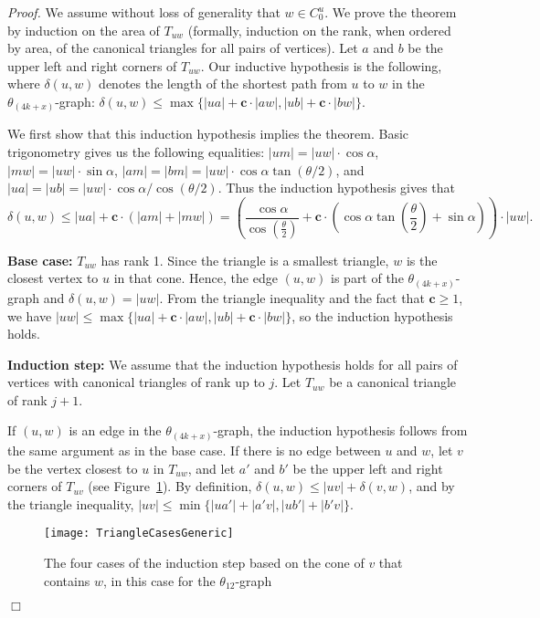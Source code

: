 \documentclass[12pt]{article}
\newenvironment{proof}{\emph{Proof.}}{\hfill $\Box$\\}
\newcommand{\graph}[1]{\ensuremath{\theta_{(4 k + #1)}}-graph\xspace}
\newcommand{\canon}[2]{\ensuremath{T_{#1 #2}}}
\newcommand{\const}{\ensuremath{\boldsymbol{c}}\xspace}
\begin{document}
\begin{proof}
  We assume without loss of generality that $w \in C_0^u$. We prove the theorem by induction on the area of \canon{u}{w} (formally, induction on the rank, when ordered by area, of the canonical triangles for all pairs of vertices). Let $a$ and $b$ be the upper left and right corners of \canon{u}{w}. Our inductive hypothesis is the following, where $\delta(u,w)$ denotes the length of the shortest path from $u$ to $w$ in the \graph{x}: $\delta(u, w) \leq \max\{|u a| + \const \cdot |a w|, |u b| + \const \cdot |b w|\}$. 

  We first show that this induction hypothesis implies the theorem. Basic trigonometry gives us the following equalities: $|u m| = |u w| \cdot \cos \alpha$, $|m w| = |u w| \cdot \sin \alpha$, $|a m| = |b m| = |u w| \cdot \cos \alpha \tan (\theta/2)$, and $|u a| = |u b| = |u w| \cdot \cos \alpha / \cos (\theta/2)$. Thus the induction hypothesis gives that \[\delta(u, w) \leq |u a| + \const \cdot (|a m| + |m w|) = \left( \frac{\cos \alpha}{\cos \left(\frac{\theta}{2}\right)} + \const \cdot \left(\cos \alpha \tan \left(\frac{\theta}{2}\right) + \sin \alpha\right) \right) \cdot |u w|.\] 

  \textbf{Base case:} \canon{u}{w} has rank 1. Since the triangle is a smallest triangle, $w$ is the closest vertex to $u$ in that cone. Hence, the edge $(u,w)$ is part of the \graph{x} and $\delta(u, w) = |u w|$. From the triangle inequality and the fact that $\const \geq 1$, we have $|u w| \leq \max\{|u a| + \const \cdot |a w|, |u b| + \const \cdot |b w|\}$, so the induction hypothesis holds.

  \textbf{Induction step:} We assume that the induction hypothesis holds for all pairs of vertices with canonical triangles of rank up to $j$. Let \canon{u}{w} be a canonical triangle of rank $j+1$.

  If $(u,w)$ is an edge in the \graph{x}, the induction hypothesis follows from the same argument as in the base case. If there is no edge between $u$ and $w$, let $v$ be the vertex closest to $u$ in \canon{u}{w}, and let $a'$ and $b'$ be the upper left and right corners of \canon{u}{v} (see Figure~\ref{fig:TriangleCasesGeneric}). By definition, $\delta(u, w) \leq |u v| + \delta(v, w)$, and by the triangle inequality, $|u v| \leq \min\{|u a'| + |a' v|, |u b'| + |b' v|\}$.

  \begin{figure}[ht]
    \begin{center}
      \texttt{[image: TriangleCasesGeneric]}
    \end{center}
    \caption{The four cases of the induction step based on the cone of $v$ that contains $w$, in this case for the $\theta_{12}$-graph}
    \label{fig:TriangleCasesGeneric}
  \end{figure}


\end{proof}
\end{document}
